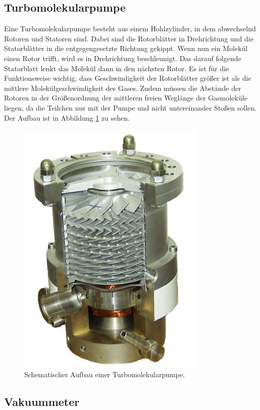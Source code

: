 \subsection{Turbomolekularpumpe}
Eine Turbomolekularpumpe besteht aus einem Hohlzylinder, in dem abwechselnd Rotoren und Statoren sind. Dabei sind die Rotorblätter in Drehrichtung und die
Statorblätter in die entgegengesetzte Richtung gekippt. Wenn nun ein Molekül einen Rotor trifft, wird es in Drehrichtung beschleunigt. Das darauf folgende Statorblatt lenkt das Molekül dann
in den nächsten Rotor. Es ist für die Funktionsweise wichtig, dass Geschwindigkeit der Rotorblätter größer ist als die mittlere Molekülgeschwindigkeit des
Gases. Zudem müssen die Abstände der Rotoren in der Größenordnung der mittleren freien Weglänge der Gasmoleküle liegen, da die Teilchen nur mit der Pumpe und
nicht untereinander Stoßen sollen. Der Aufbau ist in Abbildung \ref{img:turbopump} zu sehen.
\begin{figure}
	\centering
	\includegraphics[width=0.8\textwidth]{img/turbopump.jpg}
	\caption{Schematischer Aufbau einer Turbomolekularpumpe\cite{wiki}.}
	\label{img:turbopump}
\end{figure}
\subsection{Vakuummeter}
